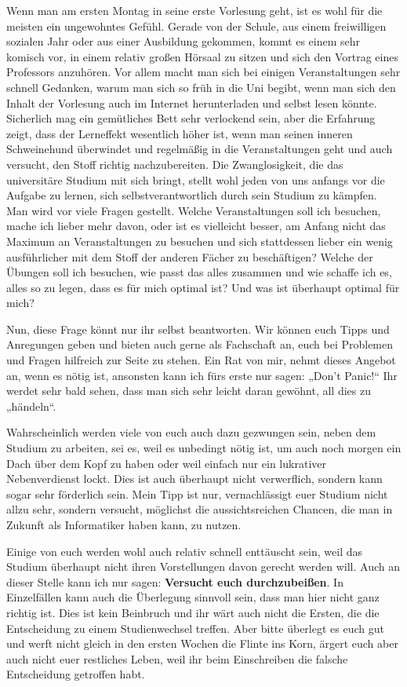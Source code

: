 Wenn man am ersten Montag in seine erste Vorlesung geht, ist es wohl für die
meisten ein ungewohntes Gefühl. Gerade von der Schule, aus einem freiwilligen
sozialen Jahr oder aus einer Ausbildung gekommen, kommt es einem sehr komisch
vor, in einem relativ großen Hörsaal zu sitzen und sich den Vortrag eines
Professors anzuhören. Vor allem macht man sich bei einigen Veranstaltungen sehr
schnell Gedanken, warum man sich so früh in die Uni begibt, wenn man sich den
Inhalt der Vorlesung auch im Internet herunterladen und selbst lesen könnte. 
Sicherlich mag ein gemütliches Bett sehr verlockend sein, aber die Erfahrung
zeigt, dass der Lerneffekt wesentlich höher ist, wenn man seinen inneren
Schweinehund überwindet und regelmäßig in die Veranstaltungen geht und auch
versucht, den Stoff richtig nachzubereiten.  Die Zwanglosigkeit, die das
universitäre Studium mit sich bringt, stellt wohl jeden von uns anfangs vor die
Aufgabe zu lernen, sich selbstverantwortlich durch sein Studium zu kämpfen. Man
wird vor viele Fragen gestellt. Welche Veranstaltungen soll ich besuchen, mache
ich lieber mehr davon, oder ist es vielleicht besser, am Anfang nicht das
Maximum an Veranstaltungen zu besuchen und sich stattdessen lieber ein wenig
ausführlicher mit dem Stoff der anderen Fächer zu beschäftigen? Welche der
Übungen soll ich besuchen, wie passt das alles zusammen und wie schaffe ich es,
alles so zu legen, dass es für mich optimal ist? Und was ist überhaupt optimal
für mich?


Nun, diese Frage könnt nur ihr selbst beantworten. Wir können euch Tipps und
Anregungen geben und bieten auch gerne als Fachschaft an, euch bei
Problemen und Fragen hilfreich zur Seite zu stehen. Ein Rat von mir, nehmt
dieses Angebot an, wenn es nötig ist, ansonsten kann ich fürs erste nur sagen:
„Don’t Panic!“ Ihr werdet sehr bald sehen, dass man sich sehr leicht daran
gewöhnt, all dies zu „händeln“.


Wahrscheinlich werden viele von euch auch dazu gezwungen sein, neben dem
Studium zu arbeiten, sei es, weil es unbedingt nötig ist, um auch noch morgen
ein Dach über dem Kopf zu haben oder weil einfach nur ein lukrativer
Nebenverdienst lockt. Dies ist auch überhaupt nicht verwerflich, sondern kann
sogar sehr förderlich sein. Mein Tipp ist nur, vernachlässigt euer Studium
nicht allzu sehr, sondern versucht, möglichst die aussichtsreichen Chancen, die
man in Zukunft als Informatiker haben kann, zu nutzen.


Einige von euch werden wohl auch relativ schnell enttäuscht sein, weil das
Studium überhaupt nicht ihren Vorstellungen davon gerecht werden will. Auch an
dieser Stelle kann ich nur sagen: \textbf{Versucht euch durchzubeißen}. In
Einzelfällen kann auch die Überlegung sinnvoll sein, dass man hier nicht ganz
richtig ist. Dies ist kein Beinbruch und ihr wärt auch nicht die Ersten, die
die Entscheidung zu einem Studienwechsel treffen. Aber bitte überlegt es euch
gut und werft nicht gleich in den ersten Wochen die Flinte ins Korn, ärgert
euch aber auch nicht euer restliches Leben, weil ihr beim Einschreiben die
falsche Entscheidung getroffen habt.


